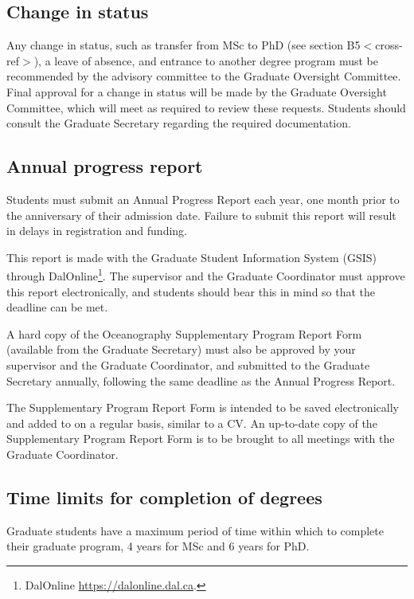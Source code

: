 \documentclass{article}
\newcommand\elink[1]{\url{#1}}
\newcommand{\fixme}[1]{\color{red}$<$#1$>$\color{black}\index{$>>>>$FIXME$<<<<$}}
\begin{document}
 

\subsection{Change in status}

Any change in status, such as transfer from MSc to PhD (see section
B5\fixme{cross-ref}), a leave of absence, and entrance to another degree
program must be recommended by the advisory committee to the Graduate Oversight
Committee. Final approval for a change in status will be made by the Graduate
Oversight Committee, which will meet as required to review these requests.
Students should consult the Graduate Secretary regarding the required
documentation.


\subsection{Annual progress report}

Students must submit an Annual Progress Report each year, one month prior to
the anniversary of their admission date. Failure to submit this report will
result in delays in registration and funding.

This report is made with the Graduate Student Information System (GSIS) through
DalOnline\footnote{DalOnline \elink{https://dalonline.dal.ca}.}.  The
supervisor and the Graduate Coordinator must approve this report
electronically, and students should bear this in mind so that the deadline can
be met.

A hard copy of the Oceanography Supplementary Program Report Form (available
from the Graduate Secretary) must also be approved by your supervisor and the
Graduate Coordinator, and submitted to the Graduate Secretary annually,
following the same deadline as the Annual Progress Report.

The Supplementary Program Report Form is intended to be saved electronically
and added to on a regular basis, similar to a CV. An up-to-date copy of the
Supplementary Program Report Form is to be brought to all meetings with the
Graduate Coordinator.


\subsection{Time limits for completion of degrees}

Graduate students have a maximum period of time within which to complete their
graduate program, 4 years for MSc and 6 years for PhD.
\end{document}
